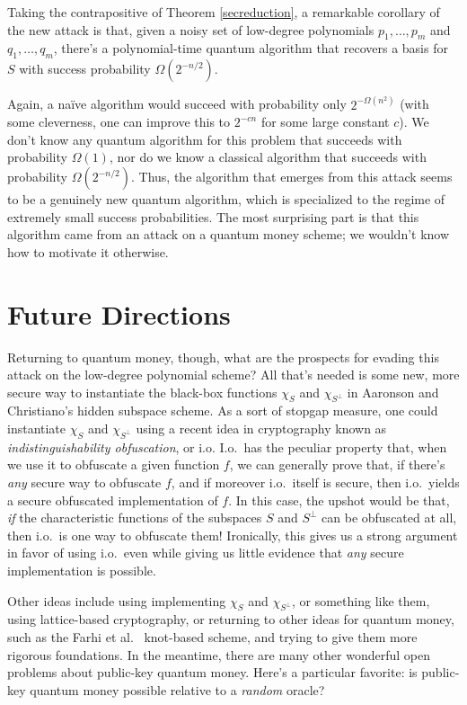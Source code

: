 \documentclass[12pt]{report}
\theoremstyle{plain}
\theoremstyle{definition}
\begin{document}
Taking the contrapositive of Theorem \ref{secreduction}, a remarkable corollary of the new attack is that, given a noisy set of low-degree polynomials $p_1,\ldots,p_m$ and $q_1,\ldots,q_m$, there's a polynomial-time quantum algorithm that recovers a basis for $S$ with success probability $\Omega(2^{-n/2})$.

Again, a na\"{i}ve algorithm would succeed with probability only $2^{-\Omega(n^2)}$ (with some cleverness, one can improve this to $2^{-cn}$ for some large constant $c$).  We don't know any quantum algorithm for this problem that succeeds with probability $\Omega(1)$, nor do we know a classical algorithm that succeeds with probability $\Omega(2^{-n/2})$.  Thus, the algorithm that emerges from this attack seems to be a genuinely new quantum algorithm, which is specialized to the regime of extremely small success probabilities.  The most surprising part is that this algorithm came from an attack on a quantum money scheme; we wouldn't know how to motivate it otherwise.

\section{Future Directions}

Returning to quantum money, though, what are the prospects for evading this attack on the low-degree polynomial scheme?  All that's needed is some new, more secure way to instantiate the black-box functions $\chi_S$ and $\chi_{S^\perp}$ in Aaronson and Christiano's hidden subspace scheme.  As a sort of stopgap measure, one could instantiate $\chi_S$ and $\chi_{S^\perp}$ using a recent idea in cryptography known as {\em indistinguishability obfuscation}, or i.o.  I.o.\ has the peculiar property that, when we use it to obfuscate a given function $f$, we can generally prove that, if there's {\em any} secure way to obfuscate $f$, and if moreover i.o.\ itself is secure, then i.o.\ yields a secure obfuscated implementation of $f$.  In this case, the upshot would be that, {\em if} the characteristic functions of the subspaces $S$ and $S^\perp$ can be obfuscated at all, then i.o.\ is one way to obfuscate them!  Ironically, this gives us a strong argument in favor of using i.o.\, even while giving us little evidence that {\em any} secure implementation is possible.

Other ideas include using implementing $\chi_S$ and $\chi_{S^\perp}$, or something like them, using lattice-based cryptography, or returning to other ideas for quantum money, such as the Farhi et al.\ \cite{knots} knot-based scheme, and trying to give them more rigorous foundations.  In the meantime, there are many other wonderful open problems about public-key quantum money.  Here's a particular favorite: is public-key quantum money possible relative to a {\em random} oracle?
\end{document}
